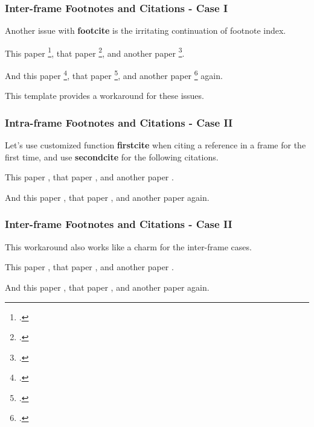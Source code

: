 \begin{frame}
    \frametitle{Inter-frame Footnotes and Citations - Case I}

    Another issue with \textbf{footcite} is the irritating continuation of footnote index. \newline

    This paper \footcite{Harshman1970}, that paper \footcite{Hitchcock1927}, and another paper \footcite{Carroll1970}. \newline

    And this paper \footcite{Harshman1970}, that paper \footcite{Hitchcock1927}, and another paper \footcite{Carroll1970} again. \newline

    This template provides a workaround for these issues.
\end{frame}

\begin{frame}
    \frametitle{Intra-frame Footnotes and Citations - Case II}
    
    Let's use customized function \textbf{firstcite} when citing a reference in a frame for the first time, and use \textbf{secondcite} for the following citations. \newline

    This paper , that paper , and another paper . \newline

    And this paper , that paper , and another paper  again. 
\end{frame}

\begin{frame}
    \frametitle{Inter-frame Footnotes and Citations - Case II}

    This workaround also works like a charm for the inter-frame cases. \newline

    This paper , that paper , and another paper . \newline

    And this paper , that paper , and another paper  again. 
\end{frame}

